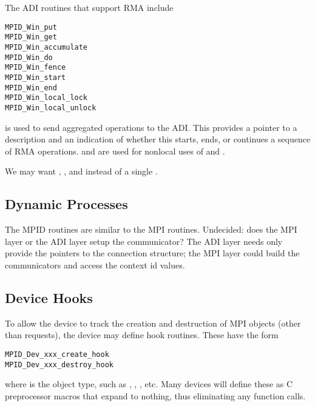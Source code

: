 The ADI routines that support RMA include
\begin{verbatim}
MPID_Win_put
MPID_Win_get
MPID_Win_accumulate
MPID_Win_do
MPID_Win_fence
MPID_Win_start
MPID_Win_end
MPID_Win_local_lock
MPID_Win_local_unlock
\end{verbatim}
 is used to send aggregated operations to the ADI.  This
provides a pointer to a description and an indication of whether this starts,
ends, or continues a sequence of RMA operations.   and
 are used for nonlocal uses of  and .

We may want , , and
 instead of a single .

\subsection{Dynamic Processes}
The MPID routines are similar to the MPI routines.  Undecided: does
the MPI layer or the ADI layer setup the communicator?  The ADI layer
needs only provide the pointers to the connection structure; the MPI
layer could build the communicators and access the context id values.

\subsection{Device Hooks}
To allow the device to track the creation and destruction of MPI
objects (other than requests), the device may define hook routines.
These have the form
\begin{verbatim}
MPID_Dev_xxx_create_hook
MPID_Dev_xxx_destroy_hook
\end{verbatim}
where  is the object type, such as ,
, , etc.  Many devices will define these as
C preprocessor macros that expand to nothing, thus eliminating any
function calls.
